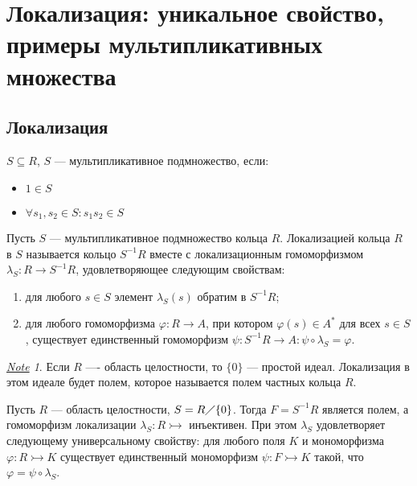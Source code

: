 \documentclass[11pt]{book}
\newcommand{\po}{\diagup}
\theoremstyle{definition}
\theoremstyle{plain}
\theoremstyle{plain}
\newtheorem{lm}{Lemma}
\theoremstyle{definition}
\theoremstyle{remark}
\newtheorem*{note}{\underline{Note}}
\begin{document}
\section{Локализация: уникальное свойство, примеры мультипликативных множества}
\subsection{Локализация}
%
\begin{defn}
    $ S \subseteq R$, $ S$ --- мультипликативное подмножество, если:
    \begin{itemize}[noitemsep]
	\item $ 1 \in  S$
	\item  $\forall s_1, s_2 \in  S: s_1 s_2 \in S$
    \end{itemize}
\end{defn}
\begin{defn}
    Пусть $ S$ --- мультипликативное подмножество кольца  $ R$. {\sf Локализацией кольца}  $ R$ в  $ S$ называется кольцо  $ S^{-1}R$ вместе с локализационным гомоморфизмом $ \lambda_S : R \to  S^{-1}R$, удовлетворяющее следующим свойствам:
    \begin{enumerate}[noitemsep,label={\rm (\arabic*)}]
	\item для любого $ s \in S  $ элемент $ \lambda_S(s) $ обратим в  $ S^{-1}R$;
	\item для любого гомоморфизма $ \varphi : R \to  A$, при котором $ \varphi (s) \in A^{*}$ для всех  $ s \in S$, существует единственный гомоморфизм $ \psi : S^{-1}R \to  A: \psi \circ \lambda_S = \varphi $.
    \end{enumerate}
\end{defn}
\begin{note}
    Если $ R$ ---- область целостности, то  $ \{0 \}$ --- простой идеал.
    Локализация в этом идеале будет полем, которое называется {\sf полем частных кольца $ R$}.
\end{note}
\begin{thm}
    Пусть $ R$ --- область целостности, $ S = R \po \{0\}$. Тогда $ F = S^{-1}R$ является полем, а гомоморфизм локализации $ \lambda_S: R \rightarrowtail$ инъективен. При этом  $ \lambda_S$ удовлетворяет следующему универсальному свойству: для любого поля  $ K$ и мономорфизма  $ \varphi :R \rightarrowtail K$ существует единственный мономорфизм $ \psi: F \rightarrowtail K$ такой, что  $ \varphi  = \psi \circ \lambda_S$.
\end{thm}
\end{document}
